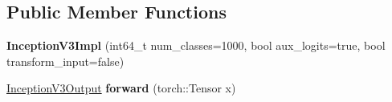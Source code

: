 \subsection*{Public Member Functions}
\begin{DoxyCompactItemize}
\item 
\mbox{\label{structvision_1_1models_1_1InceptionV3Impl_a120f8e76eda13549bd77ff13ffd1cb6b}} 
{\bfseries Inception\+V3\+Impl} (int64\+\_\+t num\+\_\+classes=1000, bool aux\+\_\+logits=true, bool transform\+\_\+input=false)
\item 
\mbox{\label{structvision_1_1models_1_1InceptionV3Impl_a2b3c145619b8eae0c1fba671232be0f3}} 
\hyperlink{structvision_1_1models_1_1InceptionV3Output}{Inception\+V3\+Output} {\bfseries forward} (torch\+::\+Tensor x)
\end{DoxyCompactItemize}
